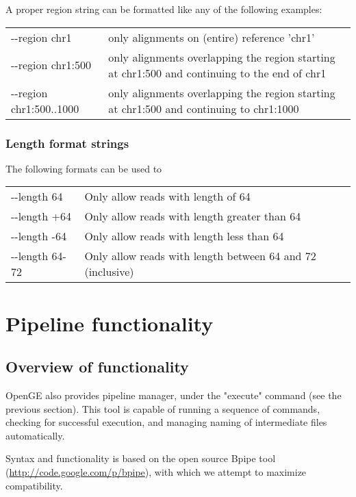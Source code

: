 \documentclass[11pt]{article}
\begin{document}
A proper region string can be formatted like any of the following examples:

\begin{center}
\begin{tabular}{lp{3.5in}}
{-}{-}region chr1&only alignments on (entire) reference 'chr1'\\
{-}{-}region chr1:500&only alignments overlapping the region starting at chr1:500 and continuing to the end of chr1\\
{-}{-}region chr1:500..1000&only alignments overlapping the region starting at chr1:500 and continuing to chr1:1000\\
\end{tabular}
\end{center}

\subsubsection{Length format strings}
The following formats can be used to 
\begin{center}
\begin{tabular}{lp{3.5in}}
{-}{-}length 64&Only allow reads with length of 64\\
{-}{-}length +64&Only allow reads with length greater than 64\\
{-}{-}length -64&Only allow reads with length less than 64\\
{-}{-}length 64-72&Only allow reads with length between 64 and 72 (inclusive)\\
\end{tabular}
\end{center}

\section {Pipeline functionality}
\subsection {Overview of functionality}
\label{pipeline_functionality}
OpenGE also provides pipeline manager, under the "execute" command (see the previous section). This tool is capable of running a sequence of commands, checking for successful execution, and managing naming of intermediate files automatically.

Syntax and functionality is based on the open source Bpipe tool (\url{http://code.google.com/p/bpipe}), with which we attempt to maximize compatibility.
\end{document}
